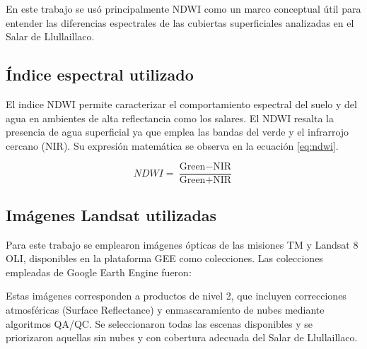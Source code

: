 En este trabajo se usó principalmente NDWI como un marco conceptual útil para entender las diferencias espectrales de las cubiertas superficiales analizadas en el Salar de Llullaillaco.


\subsection{Índice espectral utilizado}

El indice NDWI permite caracterizar el comportamiento espectral del suelo y del agua en ambientes de alta reflectancia como los salares. El NDWI resalta la presencia de agua superficial ya que emplea las bandas del verde y el infrarrojo cercano (NIR). Su expresión matemática se observa en la ecuación \ref{eq:ndwi}.

    \begin{equation}
        \label{eq:ndwi}
        NDWI = \frac{\text{Green} - \text{NIR}}{\text{Green} + \text{NIR}}
    \end{equation}



\subsection{Imágenes Landsat utilizadas}

Para este trabajo se emplearon imágenes ópticas de las misiones  TM y Landsat 8 OLI, disponibles en la plataforma GEE como colecciones. Las colecciones empleadas de Google Earth Engine fueron:


Estas imágenes corresponden a productos de nivel 2, que incluyen correcciones atmosféricas (Surface Reflectance) y enmascaramiento de nubes mediante algoritmos QA/QC. Se seleccionaron todas las escenas disponibles y se priorizaron aquellas sin nubes y con cobertura adecuada del Salar de Llullaillaco.

